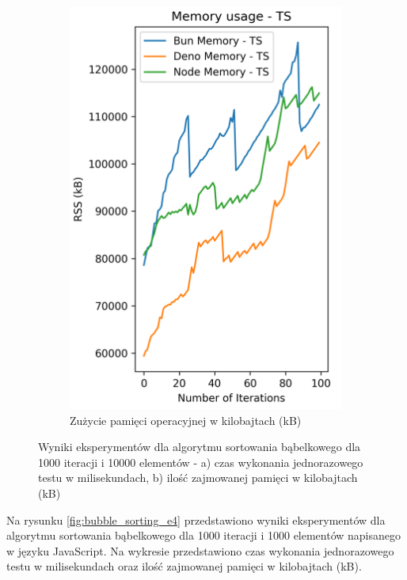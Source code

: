 \begin{figure}[H]
\begin{subfigure}[b]{0.4\textwidth}
    \includegraphics[width=\textwidth]{Figures/sorting/sorting_bubble_100_10000_ts_memory.png}
    \caption{Zużycie pamięci operacyjnej w kilobajtach (kB)}
    \label{fig:bubble_sorting_e3_ts_memory}
  \end{subfigure}
  \caption{Wyniki eksperymentów dla algorytmu sortowania bąbelkowego dla 1000 iteracji i 10000 elementów - a) czas wykonania jednorazowego testu w milisekundach, b) ilość zajmowanej pamięci w kilobajtach (kB)}
  \label{fig:bubble_sorting_e3_ts}
\end{figure}

Na rysunku \ref{fig:bubble_sorting_e4} przedstawiono wyniki eksperymentów dla algorytmu sortowania bąbelkowego dla 1000 iteracji i 1000 elementów napisanego w języku JavaScript. Na wykresie przedstawiono czas wykonania jednorazowego testu w milisekundach oraz ilość zajmowanej pamięci w kilobajtach (kB).

